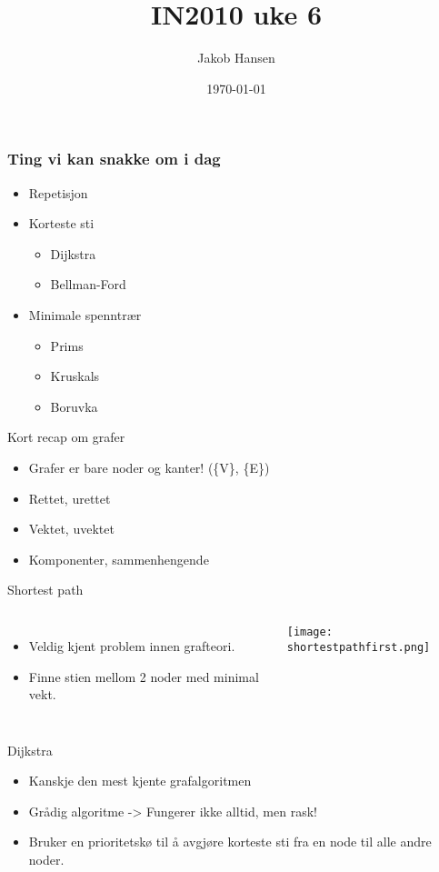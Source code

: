 \documentclass[norsk, handout]{beamer}
\title{IN2010 uke 6}
\author{Jakob Hansen}
\date{\today}
\begin{document}
	\frame{\titlepage}
	\begin{frame}
       \frametitle{Ting vi kan snakke om i dag}
       \begin{itemize}
           \item Repetisjon
		   \item Korteste sti
			   \begin{itemize}
				   \item Dijkstra
				   \item Bellman-Ford
				\end{itemize}
		   \item Minimale spenntrær
			   \begin{itemize}
				   \item Prims
				   \item Kruskals
				   \item Boruvka
				\end{itemize}
       \end{itemize}
    \end{frame}

	\begin{frame}{Kort recap om grafer}
		\begin{itemize}
			\item Grafer er bare noder og kanter! (\{V\}, \{E\})
			\item Rettet, urettet
			\item Vektet, uvektet
			\item Komponenter, sammenhengende
		\end{itemize}
	\end{frame}


	\begin{frame}{Shortest path}
		\begin{columns}
		\begin{itemize}
			\item Veldig kjent problem innen grafteori.
			\item Finne stien mellom 2 noder med minimal vekt.
		\end{itemize}

			\texttt{[image: shortestpathfirst.png]}
		\end{columns}
	\end{frame}

	\begin{frame}{Dijkstra}
		\begin{itemize}
			\item Kanskje den mest kjente grafalgoritmen
			\item Grådig algoritme -> Fungerer ikke alltid, men rask!
			\item Bruker en prioritetskø til å avgjøre korteste sti fra en node til alle
				andre noder.
		\end{itemize}
	\end{frame}
\end{document}
